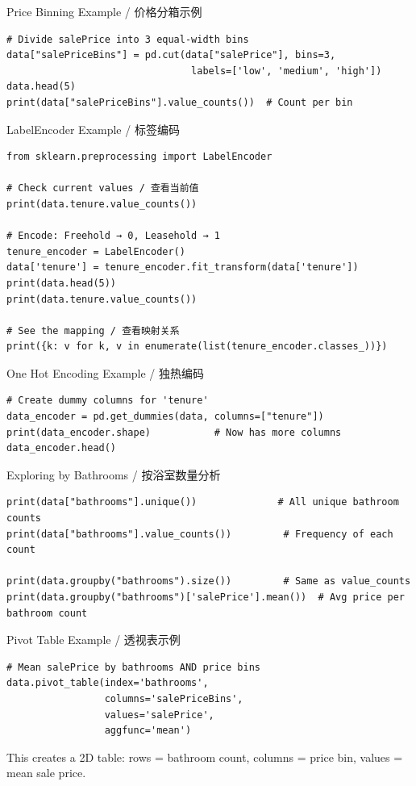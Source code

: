 \documentclass[11pt,a4paper]{report}
\begin{document}
\begin{examplebox}{Price Binning Example / 价格分箱示例}
\begin{lstlisting}
# Divide salePrice into 3 equal-width bins
data["salePriceBins"] = pd.cut(data["salePrice"], bins=3,
                                labels=['low', 'medium', 'high'])
data.head(5)
print(data["salePriceBins"].value_counts())  # Count per bin
\end{lstlisting}
\end{examplebox}

\begin{examplebox}{LabelEncoder Example / 标签编码}
\begin{lstlisting}
from sklearn.preprocessing import LabelEncoder

# Check current values / 查看当前值
print(data.tenure.value_counts())

# Encode: Freehold → 0, Leasehold → 1
tenure_encoder = LabelEncoder()
data['tenure'] = tenure_encoder.fit_transform(data['tenure'])
print(data.head(5))
print(data.tenure.value_counts())

# See the mapping / 查看映射关系
print({k: v for k, v in enumerate(list(tenure_encoder.classes_))})
\end{lstlisting}
\end{examplebox}

\begin{examplebox}{One Hot Encoding Example / 独热编码}
\begin{lstlisting}
# Create dummy columns for 'tenure'
data_encoder = pd.get_dummies(data, columns=["tenure"])
print(data_encoder.shape)           # Now has more columns
data_encoder.head()
\end{lstlisting}
\end{examplebox}

\begin{examplebox}{Exploring by Bathrooms / 按浴室数量分析}
\begin{lstlisting}
print(data["bathrooms"].unique())              # All unique bathroom counts
print(data["bathrooms"].value_counts())         # Frequency of each count

print(data.groupby("bathrooms").size())         # Same as value_counts
print(data.groupby("bathrooms")['salePrice'].mean())  # Avg price per bathroom count
\end{lstlisting}
\end{examplebox}

\begin{examplebox}{Pivot Table Example / 透视表示例}
\begin{lstlisting}
# Mean salePrice by bathrooms AND price bins
data.pivot_table(index='bathrooms',
                 columns='salePriceBins',
                 values='salePrice',
                 aggfunc='mean')
\end{lstlisting}
    This creates a 2D table: rows = bathroom count, columns = price bin, values = mean sale price.
\end{examplebox}
\end{document}
